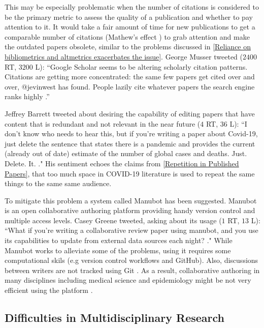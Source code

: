 \documentclass[acmsmall,authordraft]{acmart}
\begin{document}
This may be especially problematic when the number of citations is considered to be the primary metric to assess the quality of a publication and whether to pay attention to it. It would take a fair amount of time for new publications to get a comparable number of citations (Mathew's effect \citep{beel2009google}) to grab attention and make the outdated papers obsolete, similar to the problems discussed in \autoref{Reliance on bibliometrics and altmetrics exacerbates the issue}. George Musser tweeted ($2400$ RT, $3200$ L): ``Google Scholar seems to be altering scholarly citation patterns. Citations are getting more concentrated: the same few papers get cited over and over, @jevinwest has found. People lazily cite whatever papers the search engine ranks highly \citep{Musser2019twitter}.''

 Jeffrey Barrett tweeted about desiring the capability of editing papers that have content that is redundant and not relevant in the near future ($4$ RT, $36$ L): ``I don't know who needs to hear this, but if you're writing a paper about Covid-19, just delete the sentence that states there is a pandemic and provides the current (already out of date) estimate of the number of global cases and deaths. Just. Delete. It. \citep{Barrett2010twitter}." 
 His sentiment echoes the claims from \autoref{Repetition in Published Papers}, that too much space in COVID-19 literature is used to repeat the same things to the same same audience. 
 
 To mitigate this problem a system called Manubot has been suggested.  Manubot is an open collaborative authoring platform providing handy version control and multiple access levels.
 Casey Greene tweeted, asking about its usage ($1$ RT, $13$ L): ``What if you're writing a collaborative review paper using manubot, and you use its capabilities to update from external data sources each night? \citep{Greene2020twitter}."  While Manubot works to alleviate some of the problems, using it requires some computational skils (e.g version control workflows and GitHub). Also, discussions between writers are not tracked using Git \citep{himmelstein2019open}. As a result, collaborative authoring in many disciplines including medical science and epidemiology might be not very efficient using the platform \citep{himmelstein2019open}.


\subsection{Difficulties in Multidisciplinary Research}
\label{Difficulties in Multidisciplinary Research}
 
\end{document}
